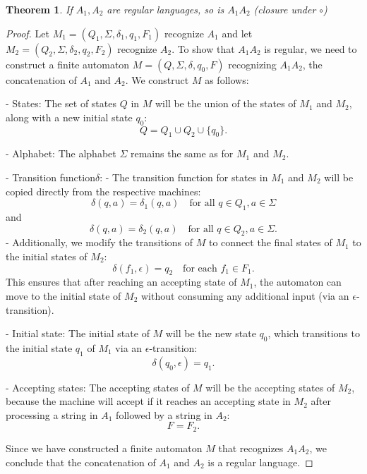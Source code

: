 \documentclass[12pt]{article}
\newtheorem{theorem}{Theorem}
\begin{document}
\begin{theorem}
    If \(A_1, A_2\) are regular languages, so is \(A_1A_2\) (closure under \(\circ\))
\end{theorem}
\begin{proof}
    Let \(M_1 = (Q_1, \Sigma, \delta_1, q_1, F_1)\) recognize \(A_1\)
    and 
    let \(M_2 = (Q_2, \Sigma, \delta_2, q_2, F_2)\) recognize \(A_2\). 
    To show that \(A_1A_2\) is regular, we need to construct a finite automaton \(M = (Q, \Sigma, \delta, q_0, F)\) recognizing \(A_1A_2\), the concatenation of \(A_1\) and \(A_2\). 
    We construct \(M\) as follows:

    \noindent 
    - States: The set of states \(Q\) in \(M\) will be the union of the states of \(M_1\) and \(M_2\), along with a new initial state \(q_0\):
      \[
      Q = Q_1 \cup Q_2 \cup \{q_0\}.
      \]
    
      \noindent 
    - Alphabet: The alphabet \(\Sigma\) remains the same as for \(M_1\) and \(M_2\).

    \noindent 
    - Transition function\(\delta\):
      - The transition function for states in \(M_1\) and \(M_2\) will be copied directly from the respective machines:
        \[
        \delta(q, a) = \delta_1(q, a) \quad \text{for all } q \in Q_1, a \in \Sigma
        \]
        and
        \[
        \delta(q, a) = \delta_2(q, a) \quad \text{for all } q \in Q_2, a \in \Sigma.
        \]
      - Additionally, we modify the transitions of \(M\) to connect the final states of \(M_1\) to the initial states of \(M_2\):
        \[
        \delta(f_1, \epsilon) = q_2 \quad \text{for each } f_1 \in F_1.
        \]
        This ensures that after reaching an accepting state of \(M_1\), the automaton can move to the initial state of \(M_2\) without consuming any additional input (via an \(\epsilon\)-transition).

        \noindent 
    - Initial state: The initial state of \(M\) will be the new state \(q_0\), which transitions to the initial state \(q_1\) of \(M_1\) via an \(\epsilon\)-transition:
      \[
      \delta(q_0, \epsilon) = q_1.
      \]

      \noindent 
    - Accepting states: The accepting states of \(M\) will be the accepting states of \(M_2\), because the machine will accept if it reaches an accepting state in \(M_2\) after processing a string in \(A_1\) followed by a string in \(A_2\):
      \[
      F = F_2.
      \]

      \noindent 
    Since we have constructed a finite automaton \(M\) that recognizes \(A_1A_2\), we conclude that the concatenation of \(A_1\) and \(A_2\) is a regular language.

\end{proof}
\end{document}

